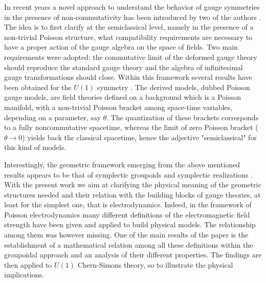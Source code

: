 \documentclass[12pt,a4paper]{article}
\numberwithin{equation}{section}
\theoremstyle{definition}
\begin{document}
In recent years a novel approach to understand the behavior of gauge symmetries in the presence of non-commutativity has been introduced by two of the authors \cite{Kupriyanov:2020sgx}. The idea is to first clarify at the semiclassical level, namely in the presence of a non-trivial Poisson structure,  what compatibility requirements are necessary to have a proper action of the gauge algebra on the space of fields. Two main requirements were adopted: the commutative limit of the deformed gauge theory should reproduce the standard gauge theory and the algebra of infinitesimal gauge transformations should close.
Within this framework several results have been obtained for the $U(1)$ symmetry \cite{Kupriyanov_2021, Kupriyanov:2021aet, Kurkov:2021kxa, Kupriyanov:2022ohu,Abla:2023odq,Bascone:2024mxs,Kupriyanov:2023gjj,Sharapov:2024bbu,Abla:2024wtr,Kurkov:2025abv}.  The derived models,    dubbed Poisson gauge models, are field theories defined on a background which is a Poisson manifold, with a non-trivial Poisson bracket among space-time variables, depending on a parameter, say $\theta$. The quantization of these brackets corresponds to a fully noncommutative spacetime, whereas the limit of zero Poisson bracket ($\theta\rightarrow 0$) yields back the classical spacetime,  hence the adjective "semiclassical" for this kind of models.

Interestingly, the geometric framework emerging from the above mentioned results appears to be that of symplectic groupoids and symplectic realizations \cite{Kupriyanov:2023qot, DiCosmo:2023wth}. With the present work we aim at clarifying the physical meaning of the geometric structures needed and their relation with the building blocks of  gauge theories, at least for the simplest one, that is electrodynamics. Indeed, in the framework of Poisson electrodynamics many different definitions of the electromagnetic field strength have been given and applied to build physical models. The relationship among them was however missing. One of the main results of the paper is the establishment of  a mathematical relation among all these  definitions within the groupoidal approach and an analysis of their different properties. The findings are then applied to $U(1)$ Chern-Simons theory, so to illustrate the physical implications.
\end{document}
